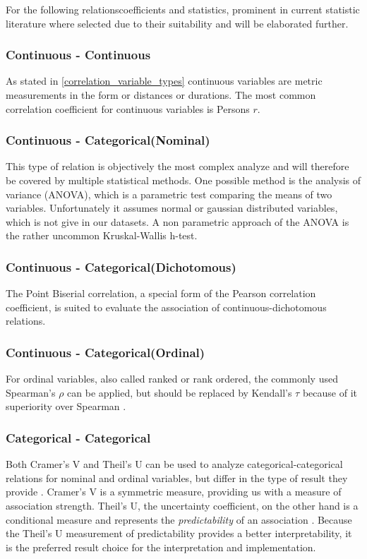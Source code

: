 \documentclass[a4paper,12pt]{report}
\begin{document}
For the following relationscoefficients and statistics, prominent in current statistic literature where selected due to their suitability and will be elaborated further.


\subsubsection{Continuous - Continuous}
As stated in \ref{correlation_variable_types} continuous variables are metric measurements in the form or distances or durations. The most common correlation coefficient for continuous variables is Persons $r$.

\subsubsection{Continuous - Categorical(Nominal)}
This type of relation is objectively the most complex analyze and will therefore be covered by multiple statistical methods. One possible method is the analysis of variance (ANOVA), which is a parametric test comparing the means of two variables. Unfortunately it assumes normal or gaussian distributed variables, which is not give in our datasets. A non parametric approach of the ANOVA is the rather uncommon Kruskal-Wallis h-test. \cite{Leon1998}

\subsubsection{Continuous - Categorical(Dichotomous)}
The Point Biserial correlation, a special form of the Pearson correlation coefficient, is suited to evaluate the association of continuous-dichotomous relations. 

\subsubsection{Continuous - Categorical(Ordinal)}
For ordinal variables, also called ranked or rank ordered, the commonly used Spearman's $\rho$ can be applied, but should be replaced by Kendall's $\tau$ because of it superiority over Spearman \cite{Newson2002}. 

\subsubsection{Categorical - Categorical}
Both Cramer’s V and Theil’s U can be used to analyze categorical-categorical relations for nominal and ordinal variables, but differ in the type of result they provide \cite{OutsideTwoStandardDeviations2018}. Cramer’s V is a symmetric measure, providing us with a measure of association strength. Theil’s U, the uncertainty coefficient, on the other hand is a conditional measure and represents the \textit{predictability} of an association \cite{Akoglu2018,StackExchange2020}. Because the Theil’s U measurement of predictability provides a better interpretability, it is the preferred  result choice for the interpretation and implementation. 
\end{document}
